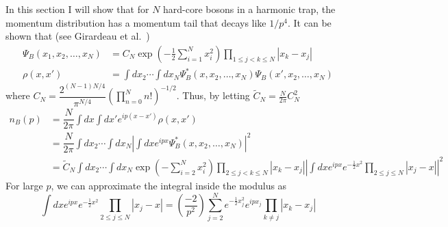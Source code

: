 \documentclass[onecolumn,english,aps,pra]{revtex4}
\begin{document}
In this section I will show that for $N$ hard-core bosons in a harmonic trap, the momentum distribution has a momentum tail that decays like $1/p^4$. It can be shown that (see Girardeau et al. \footnotemark\,)
\begin{align*}
\Psi_B(x_{1}, x_{2}, \ldots, x_{N}) & = C_{N} \exp\left(-\frac{1}{2} \sum_{i = 1}^{N} x_{i}^2\right) \prod_{1 \leq j < k \leq N} |x_{k} - x_{j}|\\
\rho(x, x') & = \int dx_{2} \cdots \int dx_{N} \Psi_{B}^*(x, x_{2}, \ldots, x_{N}) \Psi_{B}(x', x_{2}, \ldots, x_{N})
\end{align*}
where $C_{N} = \dfrac{2^{(N - 1)N/4}}{\pi^{N/4}} \left( \prod_{n = 0}^{N} n! \right)^{-1/2}$. Thus, by letting $\tilde{C}_{N} = \frac{N}{2 \pi} C_{N}^2$
%
\begin{align*}
n_{B}(p) &= \dfrac{N}{2 \pi} \int dx \int dx' e^{i p (x - x')} \rho(x, x')\\
& = \dfrac{N}{2 \pi} \int dx_{2} \cdots \int dx_{N} \left| \int dx e^{i p x} \Psi_{B}^*(x, x_{2}, \ldots, x_{N}) \right|^2\\
& = \tilde{C}_{N} \int dx_{2} \cdots \int dx_{N} \exp\left(- \sum_{i = 2}^{N} x_{i}^2\right) \prod_{2 \leq j < k \leq N} |x_{k} - x_{j}| 
	\left| \int dx e^{i p x} e^{-\frac{1}{2} x^2} \prod_{2 \leq j \leq N} |x_{j} - x| \right|^2
\end{align*} 
%
For large $p$, we can approximate the integral inside the modulus as
\[
\int dx e^{i p x} e^{-\frac{1}{2} x^2} \prod_{2 \leq j \leq N} |x_{j} - x| = \left( \dfrac{-2}{p^2} \right) \sum_{j = 2}^{N} e^{-\frac{1}{2} x_{j}^2} e^{i p x_{j}} \prod_{k \neq j} |x_{k} - x_{j}|
\]

	
\end{document}

